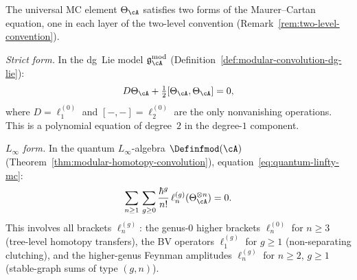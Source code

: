 \begin{remark}
\label{rem:two-mc-equations}
The universal MC element $\Theta_\cA$ satisfies two forms of the
Maurer--Cartan equation, one in each layer of the two-level
convention (Remark~\ref{rem:two-level-convention}).

\emph{Strict form.}  In the dg~Lie model
$\mathfrak{g}_{\cA}^{\mathrm{mod}}$
(Definition~\ref{def:modular-convolution-dg-lie}):
\begin{equation}\label{eq:strict-mc}
D\Theta_\cA + \tfrac{1}{2}[\Theta_\cA, \Theta_\cA] = 0,
\end{equation}
where $D = \ell_1^{(0)}$ and $[-,-] = \ell_2^{(0)}$ are the only
nonvanishing operations.  This is a polynomial equation of degree~$2$
in the degree-$1$ component.

\emph{$L_\infty$ form.}  In the quantum $L_\infty$-algebra
$\Definfmod(\cA)$
(Theorem~\ref{thm:modular-homotopy-convolution}),
equation~\eqref{eq:quantum-linfty-mc}:
\[
\sum_{n \geq 1}\, \sum_{g \geq 0}
\frac{\hbar^g}{n!}\,
\ell_n^{(g)}(\Theta_\cA^{\otimes n}) = 0.
\]
This involves all brackets $\ell_n^{(g)}$: the genus-$0$ higher
brackets $\ell_n^{(0)}$ for $n \geq 3$ (tree-level homotopy
transfers), the BV operators $\ell_1^{(g)}$ for $g \geq 1$
(non-separating clutching), and the higher-genus Feynman amplitudes
$\ell_n^{(g)}$ for $n \geq 2$, $g \geq 1$
(stable-graph sums of type $(g,n)$).


\end{remark}
